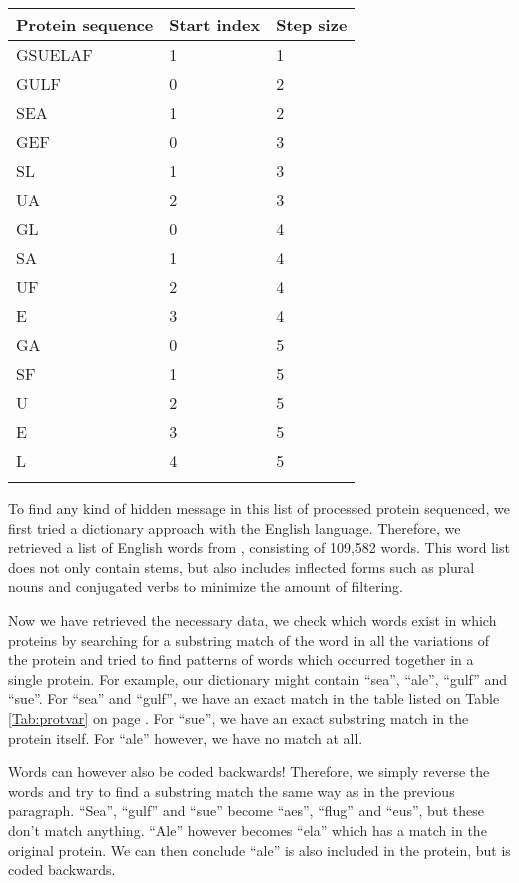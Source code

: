 \documentclass{bioinfo}
\begin{document}
\begin{table}[!t]
{\begin{tabular}{lll}\toprule
Protein sequence & Start index & Step size\\\midrule
GSUELAF & 1 & 1 \\
GULF & 0 & 2 \\
SEA & 1 & 2 \\
GEF & 0 & 3 \\
SL & 1 & 3 \\
UA & 2 & 3 \\
GL & 0 & 4 \\
SA & 1 & 4 \\
UF & 2 & 4 \\
E & 3 & 4 \\
GA & 0 & 5 \\
SF & 1 & 5 \\
U & 2 & 5 \\
E & 3 & 5 \\
L & 4 & 5 \\\botrule
\end{tabular}}{}
\end{table}

To find any kind of hidden message in this list of processed protein sequenced, we first tried a dictionary approach with the English language. Therefore, we retrieved a list of English words from \cite{SILInt}, consisting of 109,582 words. This word list does not only contain stems, but also includes inflected forms such as plural nouns and conjugated verbs to minimize the amount of filtering.

Now we have retrieved the necessary data, we check which words exist in which proteins by searching for a substring match of the word in all the variations of the protein and tried to find patterns of words which occurred together in a single protein. For example, our dictionary might contain ``sea'', ``ale'', ``gulf'' and ``sue''. For ``sea'' and ``gulf'', we have an exact match in the table listed on Table \ref{Tab:protvar} on page \pageref{Tab:protvar}. For ``sue'', we have an exact substring match in the protein itself. For ``ale'' however, we have no match at all.

Words can however also be coded backwards! Therefore, we simply reverse the words and try to find a substring match the same way as in the previous paragraph. ``Sea'', ``gulf'' and ``sue'' become ``aes'', ``flug'' and ``eus'', but these don't match anything. ``Ale'' however becomes ``ela'' which has a match in the original protein. We can then conclude ``ale'' is also included in the protein, but is coded backwards.
\end{document}
